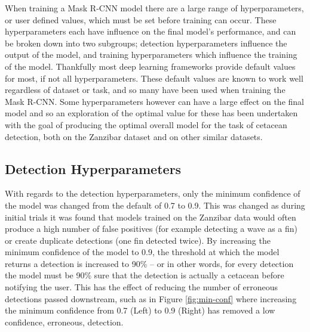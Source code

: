 When training a Mask R-CNN model there are a large range of hyperparameters, or user defined values, which must be set before training can occur. These hyperparameters each have influence on the final model's performance, and can be broken down into two subgroups; detection hyperparameters influence the output of the model, and training hyperparameters which influence the training of the model. Thankfully most deep learning frameworks provide default values for most, if not all hyperparameters. These default values are known to work well regardless of dataset or task, and so many have been used when training the Mask R-CNN. Some hyperparameters however can have a large effect on the final model and so an exploration of the optimal value for these has been undertaken with the goal of producing the optimal overall model for the task of cetacean detection, both on the Zanzibar dataset and on other similar datasets. 

\subsection{Detection Hyperparameters}\label{ch:cetDet,sec:ModelSelection,sub:DetectionHyperparameters}
 
 With regards to the detection hyperparameters, only the minimum confidence of the model was changed from the default of 0.7 to 0.9. This was changed as during initial trials it was found that models trained on the Zanzibar data would often produce a high number of false positives (for example detecting a wave as a fin) or create duplicate detections (one fin detected twice). By increasing the minimum confidence of the model to 0.9, the threshold at which the model returns a detection is increased to 90\% -- or in other words, for every detection the model must be 90\% sure that the detection is actually a cetacean before notifying the user. This has the effect of reducing the number of erroneous detections passed downstream, such as in Figure \ref{fig:min-conf} where increasing the minimum confidence from 0.7 (Left) to 0.9 (Right) has removed a low confidence, erroneous, detection. 
 
